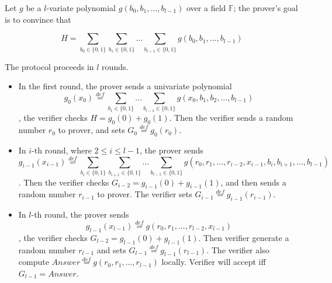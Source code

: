 \begin{definition}
Let $g$ be a $l$-variate polynomial $g(b_0, b_1, ..., b_{l-1})$ over a field $\mathbb{F}$; the prover's goal is to convince that 

$$H=\sum_{b_0\in\{0,1\}}\sum_{b_1\in\{0,1\}}...\sum_{b_{l-1}\in\{0,1\}}g(b_0,b_1,...,b_{l-1})$$
\end{definition}

\begin{protocol}
The protocol proceeds in $l$ rounds. 
\begin{itemize}
\item In the first round, the prover sends a univariate polynomial $$g_0(x_0)\overset{def}{=}\sum_{b_1\in\{0,1\}}...\sum_{b_{l-1}\in\{0,1\}}g(x_0, b_1, b_2, ..., b_{l-1})$$, the verifier checks $H=g_0(0)+g_0(1)$. Then the verifier sends a random number $r_0$ to prover, and sets $G_0\overset{def}{=}g_{0}(r_0)$.
\item In $i$-th round, where $2\le i \le l-1$, the prover sends $$g_{i-1}(x_{i-1})\overset{def}{=}\sum_{b_{i}\in\{0,1\}}\sum_{b_{i+1}\in\{0,1\}}...\sum_{b_{l-1}\in\{0,1\}}g(r_0, r_1, ..., r_{i-2}, x_{i-1}, b_{i}, b_{i+1}, ..., b_{l-1})$$. Then the verifier checks $G_{i-2}=g_{i-1}(0)+g_{i-1}(1)$, and then sends a random number $r_{i-1}$ to prover. The verifier sets $G_{i-1}\overset{def}{=}g_{i-1}(r_{i-1})$.
\item In $l$-th round, the prover sends $$g_{l-1}(x_{l-1})\overset{def}{=}g(r_0, r_1, ..., r_{l-2}, x_{l-1})$$, the verifier checks $G_{l-2}=g_{l-1}(0)+g_{l-1}(1)$. Then verifier generate a random number $r_{l-1}$ and sets $G_{l-1}\overset{def}{=}g_{l-1}(r_{l-1})$. The verifier also compute $Answer\overset{def}{=}g(r_0, r_1, ..., r_{l-1})$ locally. Verifier will accept iff $G_{l-1}=Answer$.
\end{itemize}
\end{protocol}

\begin{definition}

\end{definition}

